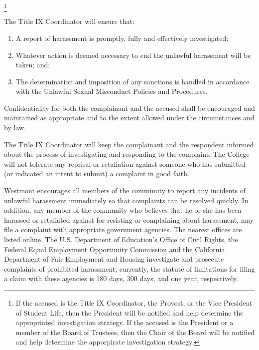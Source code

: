 			\footnote{

				If the accused is the Title IX Coordinator, the Provost, or the Vice
				President of Student Life, then the President will be
				notified and help determine the appropriated investigation
				strategy. If the accused is the President or a member of the
				Board of Trustees, then the Chair of the Board will be notified
				and help determine the apporpirate investigation strategy.

			}


			\quad The Title IX Coordinator will ensure that:
			\begin{enumerate}[label=\alph*)]
				\item{ A report of harassment is promptly, fully and effectively
					investigated; }

				\item{ Whatever action is deemed necessary to end the unlawful
					harassment will be taken; and; }

				\item{ The determination and imposition of any sanctions is handled
					in accordance with the Unlawful Sexual Misconduct Policies and Procedures.
				}

			\end{enumerate}

			\quad Confidentiality for both the complainant and the accused shall
			be encouraged and maintained as appropriate and to the extent
			allowed under the circumstances and by law.

			\quad The Title IX Coordinator will keep the complainant and the
			respondent informed about the process of investigating and
			responding to the complaint.  The College will not tolerate any
			reprisal or retaliation against someone who has submitted (or
			indicated an intent to submit) a complaint in good faith.

			\quad Westmont encourages all members of the community to report any
			incidents of unlawful harassment immediately so that complaints can
			be resolved quickly.  In addition, any member of the community who
			believes that he or she has been harassed or retaliated against for
			resisting or complaining about harassment, may file a complaint with
			appropriate government agencies.  The nearest offices are listed online.
			The U.S. Department of Education's Office
			of Civil Rights, the Federal Equal Employment Opportunity Commission
			and the California Department of Fair Employment and Housing
			investigate and prosecute complaints of prohibited harassment;
			currently, the statute of limitations for filing a claim with these
			agencies is 180 days, 300 days, and one year, respectively.

